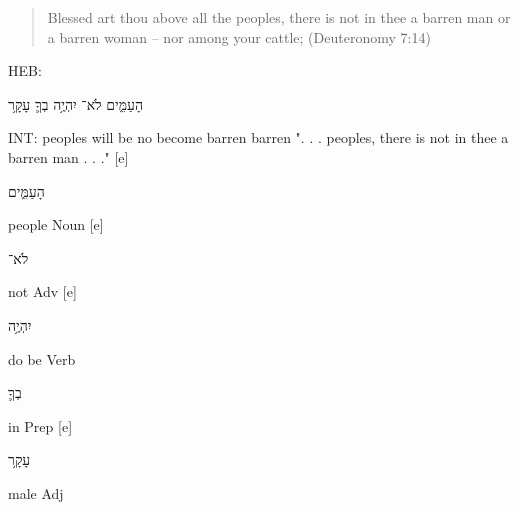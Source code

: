\documentclass[11pt]{article}
\begin{document}
\begin{quote}
Blessed art thou above all the peoples, there is not in thee a barren man or a barren woman -- nor among your cattle;
(Deuteronomy 7:14) 
\end{quote}
HEB: \begin{hebrew} הָעַמִּ֑ים לֹא־ יִהְיֶ֥ה בְךָ֛ עָקָ֥ר	\end{hebrew}\newline
INT: peoples will be no become barren barren\newline
". . . peoples, there is not in thee a barren man . . ." [e]%
\begin{hebrew}	הָעַמִּ֑ים	\end{hebrew}people	Noun [e]%
\begin{hebrew} לֹא־ \end{hebrew}	not	Adv [e]%
\begin{hebrew}	יִהְיֶ֥ה	\end{hebrew}do be	Verb\newline
\phantom{1961 [e]	} %
\begin{hebrew}בְךָ֛	\end{hebrew}in	Prep [e]%
\begin{hebrew}עָקָ֥ר\end{hebrew}	male	Adj\newline \newline 
\end{document}
